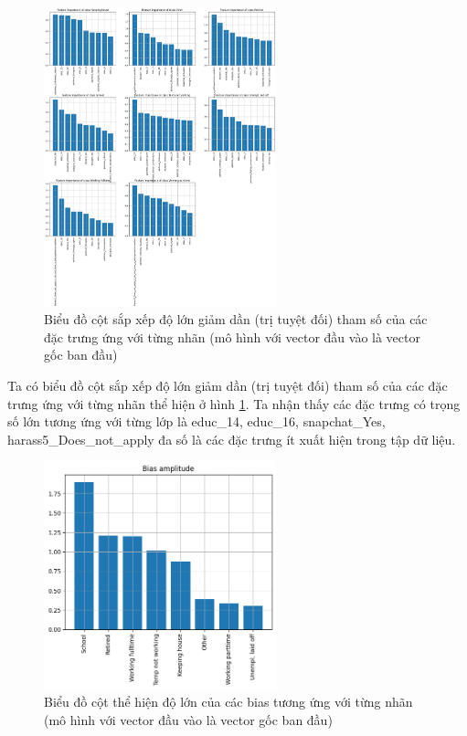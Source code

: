 \begin{enumerate}[label=(\alph*)]
    \begin{figure}[H]
        \centering
        \includegraphics[width=0.6\textwidth]{figures/Thanh/Models/Logistic/With_null_models_Feature_Importance_Logistic_original_features.png}
        \caption{Biểu đồ cột sắp xếp độ lớn giảm dần (trị tuyệt đối) tham số của các đặc trưng ứng với từng nhãn (mô hình với vector đầu vào là vector gốc ban đầu)}
        \label{fig:With_null_models_Feature_Importance_Logistic_original_features}
    \end{figure}

    Ta có biểu đồ cột sắp xếp độ lớn giảm dần (trị tuyệt đối) tham số của các đặc trưng ứng với từng nhãn thể hiện ở hình \ref{fig:With_null_models_Feature_Importance_Logistic_original_features}.
    Ta nhận thấy các đặc trưng có trọng số lớn tương ứng với từng lớp là educ\_14, educ\_16, snapchat\_Yes, harass5\_Does\_not\_apply đa số là các đặc trưng ít xuất hiện trong tập dữ liệu.

    \begin{figure}[H]
        \centering
        \includegraphics[width=0.6\textwidth]{figures/Thanh/Models/Logistic/With_null_models_Bias_Importance_Logistic_original_features.png}
        \caption{Biểu đồ cột thể hiện độ lớn của các bias tương ứng với từng nhãn (mô hình với vector đầu vào là vector gốc ban đầu)}
        \label{fig:With_null_models_Bias_Importance_Logistic_original_features.png}
    \end{figure}


\end{enumerate}
